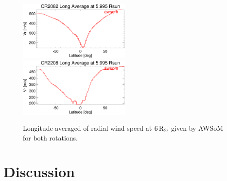 \documentclass[namedreferences]{solarphysics}
\newcommand{\mrsun}{{\rm R_\odot}}
\begin{document}
\begin{article}
\begin{figure}[h!]
\begin{center}
\includegraphics[width=0.495\textwidth]{figs/Perfil_Vr_2082_5995.eps}
\includegraphics[width=0.495\textwidth]{figs/Perfil_Vr_2208_5995.eps}
\caption{Longitude-averaged of radial wind speed at $6\,\mrsun$ given by AWSoM for both rotations.}
\label{perf_lon_vr}
\end{center}
\end{figure}



\section{Discussion}\label{discu} 
%



%
  

%



%
%


%
%

  
%
%
%   
%  

\end{article} 
\end{document}
